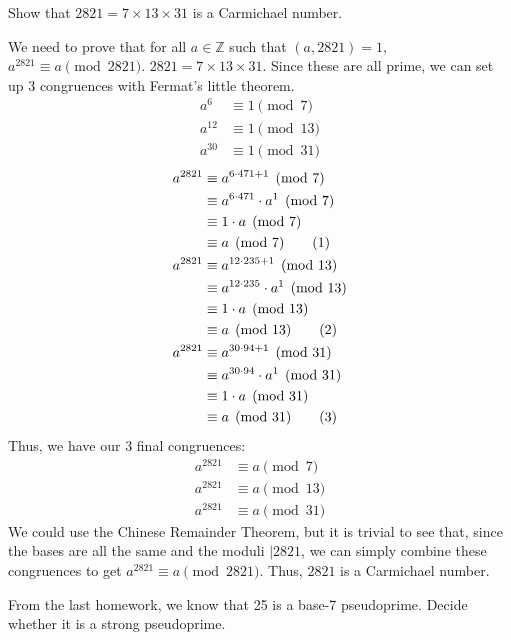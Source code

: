 \documentclass{article}
\newcommand\tagit{\addtocounter{equation}{1}\tag{\theequation}}
\begin{document}
\begin{problem}{}{}
    Show that $2821=7\times13\times31$ is a Carmichael number.
\end{problem}
\begin{solution}{}{}
    We need to prove that for all $a\in\mathbb{Z}$ such that $(a,2821)=1$, $a^{2821}\equiv a\pmod{2821}$. $2821=7\times13\times31$. Since these are all prime, we can set up 3 congruences with Fermat's little theorem.
    \begin{align*}
        a^{6} &\equiv 1\pmod{7}\\
        a^{12} &\equiv 1\pmod{13}\\
        a^{30} &\equiv 1\pmod{31}
    \end{align*}
    \begin{align*}
        a^{2821} &\equiv a^{6\cdot471+1}\pmod{7}\\
        &\equiv a^{6\cdot471}\cdot a^{1}\pmod{7}\\
        &\equiv 1\cdot a\pmod{7}\\
        &\equiv a\pmod{7} \tagit\\
        a^{2821} &\equiv a^{12\cdot235+1}\pmod{13}\\
        &\equiv a^{12\cdot235}\cdot a^1\pmod{13}\\
        &\equiv 1\cdot a\pmod{13}\\
        &\equiv a\pmod{13} \tagit\\
        a^{2821} &\equiv a^{30\cdot94+1}\pmod{31}\\
        &\equiv a^{30\cdot94}\cdot a^{1}\pmod{31}\\
        &\equiv 1\cdot a\pmod{31}\\
        &\equiv a\pmod{31} \tagit
    \end{align*}
    Thus, we have our 3 final congruences:
    \begin{align*}
        a^{2821} &\equiv a\pmod{7}\\
        a^{2821} &\equiv a\pmod{13}\\
        a^{2821} &\equiv a\pmod{31}
    \end{align*}
    We could use the Chinese Remainder Theorem, but it is trivial to see that, since the bases are all the same and the moduli $|2821$, we can simply combine these congruences to get $a^{2821}\equiv a\pmod{2821}$. Thus, $2821$ is a Carmichael number.
\end{solution}
\setcounter{equation}{0}
\begin{problem}{}{}
    From the last homework, we know that 25 is a base-7 pseudoprime. Decide whether it is a strong pseudoprime.
\end{problem}
\end{document}
